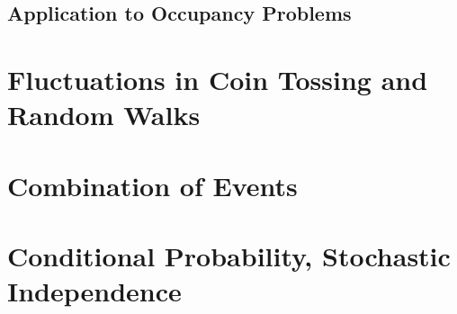 \documentclass{article}
\numberwithin{equation}{subsection}
\begin{document}
		\subsection{Application to Occupancy Problems}
	\newpage
	\section{Fluctuations in Coin Tossing and Random Walks}
			
	\newpage
	\section{Combination of Events}
					
	\newpage
	\section{Conditional Probability, Stochastic Independence}
			
		
\end{document}
